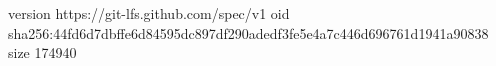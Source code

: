 version https://git-lfs.github.com/spec/v1
oid sha256:44fd6d7dbffe6d84595dc897df290adedf3fe5e4a7c446d696761d1941a90838
size 174940
